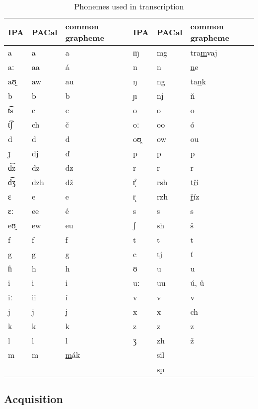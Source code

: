 \documentclass{itatnew}
\begin{document}
\begin{table*}[htpb]
\begin{center}
\begin{tabular}{|l|l|l||l|l|l|}
\hline
IPA & PACal & common grapheme & IPA & PACal &  common grapheme \\
\hline
a  & a   & a      &     ɱ  & mg  & tra\underline{m}vaj \\
aː & aa  & á      &     n  & n   & \underline{n}e \\
aʊ̯ & aw  & au     &     ŋ  & ng  & ta\underline{n}k \\
b  & b   & b      &     ɲ  & nj  & \v{n} \\
t͡s & c   & c      &     o  & o   & o \\
t͡ʃ & ch  & č      &     oː & oo  & ó \\
d  & d   & d      &     oʊ̯ & ow  & ou \\
ɟ  & dj  & \v{d}  &     p  & p   & p \\
d͡z & dz  & dz     &     r  & r   & r \\
d͡ʒ & dzh & dž     &     r̝̊  & rsh & t\underline{\v{r}}i \\
ɛ  & e   & e      &     r̝  & rzh & \underline{\v{r}}íz \\
ɛː & ee  & é      &     s  & s   & s \\
eʊ̯ & ew  & eu     &     ʃ  & sh  & š \\
f  & f   & f      &     t  & t   & t \\
g  & g   & g      &     c  & tj  & \v{t} \\
ɦ  & h   & h      &     ʊ  & u   & u \\
i  & i   & i      &     uː & uu  & ú, \r{u} \\
iː & ii  & í      &     v  & v   & v \\
j  & j   & j      &     x  & x   & ch \\
k  & k   & k      &     z  & z   & z \\
l  & l   & l      &     ʒ  & zh  & ž \\
m  & m   & \underline{m}ák
                  &        & sil & \\
   &     &        &        & sp  & \\
\hline
\end{tabular}
\caption{Phonemes used in transcription}\label{tab:phones}
\end{center}
\end{table*}
\normalfont

\subsection{Acquisition}
\end{document}
